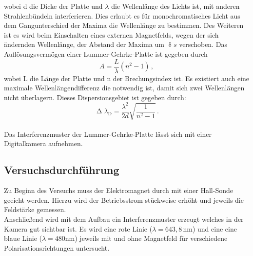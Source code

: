 wobei d die Dicke der Platte und $\lambda$ die Wellenlänge des Lichts ist, mit anderen Strahlenbündeln interferieren. Dies erlaubt es für monochromatisches Licht aus dem Gangunterschied der Maxima die Wellenlänge zu bestimmen. Des Weiteren ist es wird beim Einschalten eines externen Magnetfelds, wegen der sich ändernden Wellenlänge, der Abstand der Maxima um $\updelta s$ verschoben.
Das Auflösungsvermögen einer Lummer-Gehrke-Platte ist gegeben durch
\begin{equation}
A=\frac{L}{\lambda}\left(n^2-1\right)\,,
\label{eq:auf}
\end{equation}
wobei L die Länge der Platte und n der Brechungsindex ist. Es existiert auch eine maximale Wellenlängendifferenz die notwendig ist, damit sich zwei Wellenlängen nicht überlagern. Dieses Dispersionsgebiet ist gegeben durch:
\begin{equation}
\upDelta \lambda_\text{D}=\frac{\lambda^2}{2d}\sqrt{\frac{1}{n^2-1}}\,.
\label{eq:disp}
\end{equation}\\
Das Interferenzmuster der Lummer-Gehrke-Platte lässt sich mit einer Digitalkamera aufnehmen.
\subsection{Versuchsdurchführung}
Zu Beginn des Versuchs muss der Elektromagnet durch mit einer Hall-Sonde geeicht werden. Hierzu wird der Betriebsstrom stückweise erhöht und jeweils die Feldstärke gemessen.\\
Anschließend wird mit dem Aufbau ein Interferenzmuster erzeugt welches in der Kamera gut sichtbar ist. Es wird eine rote Linie ($\lambda=643{,}8\,\si{\nm}$) und eine eine blaue Linie ($\lambda=480\si{\nm}$) jeweils mit und ohne Magnetfeld für verschiedene Polarisationsrichtungen untersucht.
